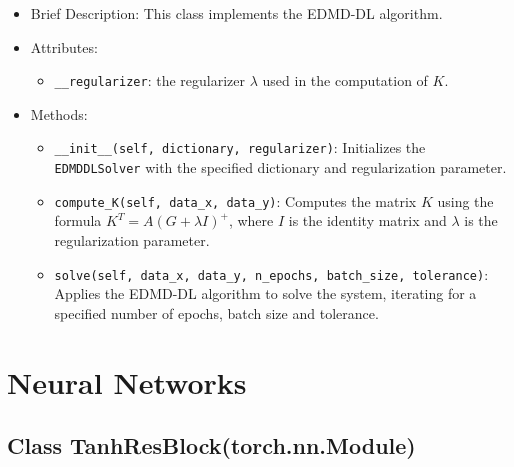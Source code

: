 \begin{itemize}
\item Brief Description: This class implements the EDMD-DL algorithm.
\item Attributes:
  \begin{itemize}
  \item \lstinline|__regularizer|: the regularizer $\lambda$
    used in the computation of $K$.
  \end{itemize}
\item Methods:
  \begin{itemize}
  \item \lstinline|__init__(self, dictionary, regularizer)|:
    Initializes the \lstinline|EDMDDLSolver| with the specified dictionary
    and regularization parameter.
  \item \lstinline|compute_K(self, data_x, data_y)|:
    Computes the matrix $K$ using the formula $K^T = A(G + \lambda I)^+$,
    where $I$ is the identity matrix and $\lambda$ is the regularization parameter.
  \item \lstinline|solve(self, data_x, data_y, n_epochs, batch_size, tolerance)|:
    Applies the EDMD-DL algorithm to solve the system,
    iterating for a specified number of epochs, batch size and tolerance.
  \end{itemize}
\end{itemize}

\section{Neural Networks}

\subsection{Class TanhResBlock(torch.nn.Module)}

